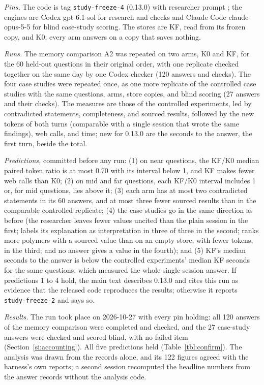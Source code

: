 \documentclass[journal=mamobx,manuscript=suppinfo]{achemso}
\newcommand{\code}[1]{\texttt{#1}}
\newcommand{\ident}[1]{\path{#1}}
\begin{document}
\emph{Pins.}
The code is tag \code{study-freeze-4} (0.13.0) with researcher prompt \ident{86404bf073ce}; the engines are Codex gpt-6.1-sol for research and checks and Claude Code claude-opus-5-5 for blind case-study scoring.
The stores are KF, read from its frozen copy, and K0; every arm answers on a copy that saves nothing.

\emph{Runs.}
The memory comparison A2 was repeated on two arms, K0 and KF, for the 60 held-out questions in their original order, with one replicate checked together on the same day by one Codex checker (120 answers and checks).
The four case studies were repeated once, as one more replicate of the controlled case studies with the same questions, arms, store copies, and blind scoring (27 answers and their checks).
The measures are those of the controlled experiments, led by contradicted statements, completeness, and sourced results, followed by the new tokens of both turns (comparable with a single session that wrote the same findings), web calls, and time; new for 0.13.0 are the seconds to the answer, the first turn, beside the total.

\emph{Predictions,} committed before any run:
(1) on near questions, the KF/K0 median paired token ratio is at most 0.70 with its interval below 1, and KF makes fewer web calls than K0;
(2) on mid and far questions, each KF/K0 interval includes 1 or, for mid questions, lies above it;
(3) each arm has at most two contradicted statements in its 60 answers, and at most three fewer sourced results than in the comparable controlled replicate;
(4) the case studies go in the same direction as before (the researcher leaves fewer values uncited than the plain session in the first; labels its explanation as interpretation in three of three in the second; ranks more polymers with a sourced value than on an empty store, with fewer tokens, in the third; and no answer gives a value in the fourth); and
(5) KF's median seconds to the answer is below the controlled experiments' median KF seconds for the same questions, which measured the whole single-session answer.
If predictions 1 to 4 hold, the main text describes 0.13.0 and cites this run as evidence that the released code reproduces the results; otherwise it reports \code{study-freeze-2} and says so.

\emph{Results.}
The run took place on 2026-10-27 with every pin holding: all 120 answers of the memory comparison were completed and checked, and the 27 case-study answers were checked and scored blind, with no failed item (Section~\ref{si:accounting}).
All five predictions held (Table~\ref{tbl:confirm}).
The analysis was drawn from the records alone, and its 122 figures agreed with the harness's own reports; a second session recomputed the headline numbers from the answer records without the analysis code.
\end{document}
